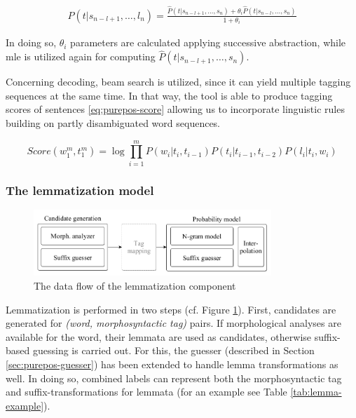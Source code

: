 \begin{align}
 P(t|s_{n-l+1}, \dots, l_n) 
 = \frac{ \hat{P}(t|s_{n-l+1}, \dots, s_n) + \theta_i \hat{P}(t|s_{n-l}, \dots, s_n)}{1+\theta_i}
\end{align}

In doing so, $\theta_i$ parameters are calculated applying successive abstraction, while \gls{mle} is utilized  again for computing $\hat{P}(t|s_{n-l+1}, \dots, s_n)$. 

Concerning decoding, beam search is utilized, since it can yield multiple tagging sequences at the same time. 
In that way, the tool is able to produce tagging scores of sentences \eqref{eq:purepos-score} allowing us to incorporate linguistic rules building on partly disambiguated word sequences. 

\begin{equation}\label{eq:purepos-score} %
Score(w_1^m,t_1^m) = \log \prod_{i=1}^m P(w_i|t_i,t_{i-1})P(t_i|t_{i-1},t_{i-2})P(l_i|t_i,w_i)
\end{equation}

\subsubsection{The lemmatization model}

\begin{figure}[H]
  \centering
  \includegraphics[width=0.8\textwidth]{MorphTagging/lemma_arch.png} %
  \caption{The data flow of the lemmatization component}
  \label{fig:lemma-arch}
\end{figure}

Lemmatization is performed in two steps (cf. Figure \ref{fig:lemma-arch}). 
First, candidates are generated for \emph{(word, morphosyntactic tag)} pairs. 
If morphological analyses are available for the word, their lemmata are used as candidates, otherwise suffix-based guessing is carried out. 
For this, the guesser (described in Section \ref{sec:purepos-guesser}) has been extended to handle lemma transformations as well. 
In doing so, combined labels can represent both the morphosyntactic tag and suffix-transformations for lemmata (for an example see Table \ref{tab:lemma-example}).


